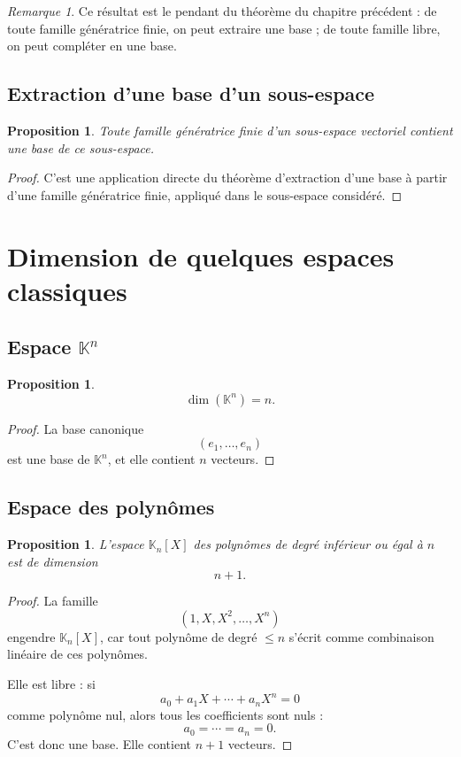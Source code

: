 \documentclass[11pt,a4paper]{article}
\newtheorem{proposition}[definition]{Proposition}
\theoremstyle{remark}
\newtheorem{remarque}[definition]{Remarque}
\newcommand{\K}{\mathbb{K}}
\begin{document}
\begin{remarque}
Ce résultat est le pendant du théorème du chapitre précédent : de toute famille génératrice finie, on peut extraire une base ; de toute famille libre, on peut compléter en une base.
\end{remarque}

\subsection{Extraction d’une base d’un sous-espace}

\begin{proposition}
Toute famille génératrice finie d’un sous-espace vectoriel contient une base de ce sous-espace.
\end{proposition}

\begin{proof}
C’est une application directe du théorème d’extraction d’une base à partir d’une famille génératrice finie, appliqué dans le sous-espace considéré.
\end{proof}

\section{Dimension de quelques espaces classiques}

\subsection{Espace \(\K^n\)}

\begin{proposition}
\[
\dim(\K^n)=n.
\]
\end{proposition}

\begin{proof}
La base canonique
\[
(e_1,\dots,e_n)
\]
est une base de \(\K^n\), et elle contient \(n\) vecteurs.
\end{proof}

\subsection{Espace des polynômes}

\begin{proposition}
L’espace \(\K_n[X]\) des polynômes de degré inférieur ou égal à \(n\) est de dimension
\[
n+1.
\]
\end{proposition}

\begin{proof}
La famille
\[
(1,X,X^2,\dots,X^n)
\]
engendre \(\K_n[X]\), car tout polynôme de degré \(\le n\) s’écrit comme combinaison linéaire de ces polynômes.

Elle est libre : si
\[
a_0+a_1X+\cdots+a_nX^n=0
\]
comme polynôme nul, alors tous les coefficients sont nuls :
\[
a_0=\cdots=a_n=0.
\]
C’est donc une base. Elle contient \(n+1\) vecteurs.
\end{proof}
\end{document}

